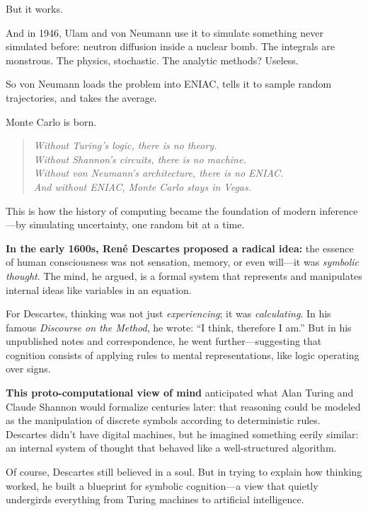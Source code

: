 But it works.

And in 1946, Ulam and von Neumann use it to simulate something never simulated before: neutron diffusion inside a nuclear bomb. The integrals are monstrous. The physics, stochastic. The analytic methods? Useless.

So von Neumann loads the problem into ENIAC, tells it to sample random trajectories, and takes the average.

Monte Carlo is born.

\begin{quote}
\textit{Without Turing’s logic, there is no theory.\\
Without Shannon’s circuits, there is no machine.\\
Without von Neumann’s architecture, there is no ENIAC.\\
And without ENIAC, Monte Carlo stays in Vegas.}
\end{quote}

This is how the history of computing became the foundation of modern inference—by simulating uncertainty, one random bit at a time.


\begin{tcolorbox}[colback=blue!5!white, colframe=blue!50!black, title=Historical Sidebar: Descartes and the Symbolic Mind]

  \textbf{In the early 1600s, René Descartes proposed a radical idea:} the essence of human consciousness was not sensation, memory, or even will—it was \emph{symbolic thought}. The mind, he argued, is a formal system that represents and manipulates internal ideas like variables in an equation.

  \medskip

  For Descartes, thinking was not just \emph{experiencing}; it was \emph{calculating}. In his famous \emph{Discourse on the Method}, he wrote: “I think, therefore I am.” But in his unpublished notes and correspondence, he went further—suggesting that cognition consists of applying rules to mental representations, like logic operating over signs.

  \medskip

  \textbf{This proto-computational view of mind} anticipated what Alan Turing and Claude Shannon would formalize centuries later: that reasoning could be modeled as the manipulation of discrete symbols according to deterministic rules. Descartes didn’t have digital machines, but he imagined something eerily similar: an internal system of thought that behaved like a well-structured algorithm.

  \medskip

  Of course, Descartes still believed in a soul. But in trying to explain how thinking worked, he built a blueprint for symbolic cognition—a view that quietly undergirds everything from Turing machines to artificial intelligence.

\end{tcolorbox}


